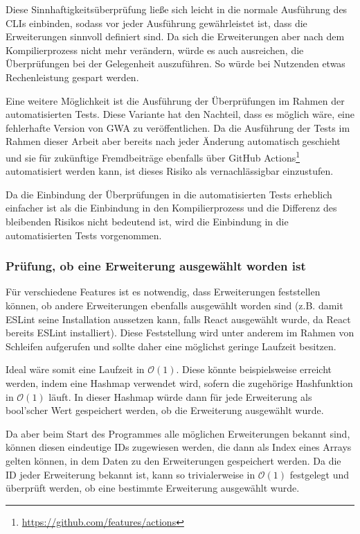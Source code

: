Diese Sinnhaftigkeitsüberprüfung ließe sich leicht in die normale Ausführung des \gls{CLI}s einbinden, sodass vor jeder Ausführung gewährleistet ist, dass die Erweiterungen sinnvoll definiert sind. Da sich die Erweiterungen aber nach dem Kompilierprozess nicht mehr verändern, würde es auch ausreichen, die Überprüfungen bei der Gelegenheit auszuführen. So würde bei Nutzenden etwas Rechenleistung gespart werden.

Eine weitere Möglichkeit ist die Ausführung der Überprüfungen im Rahmen der automatisierten Tests. Diese Variante hat den Nachteil, dass es möglich wäre, eine fehlerhafte Version von \gls{GWA} zu veröffentlichen. Da die Ausführung der Tests im Rahmen dieser Arbeit aber bereits nach jeder Änderung automatisch geschieht und sie für zukünftige Fremdbeiträge ebenfalls über GitHub Actions\footnote{\url{https://github.com/features/actions}} automatisiert werden kann, ist dieses Risiko als vernachlässigbar einzustufen.

Da die Einbindung der Überprüfungen in die automatisierten Tests erheblich einfacher ist als die Einbindung in den Kompilierprozess und die Differenz des bleibenden Risikos nicht bedeutend ist, wird die Einbindung in die automatisierten Tests vorgenommen.

\subsubsection{Prüfung, ob eine Erweiterung ausgewählt worden ist}
\label{impl:check_if_extension_has_been_chosen}
Für verschiedene Features ist es notwendig, dass Erweiterungen feststellen können, ob andere Erweiterungen ebenfalls ausgewählt worden sind (z.B. damit ESLint seine Installation aussetzen kann, falls React ausgewählt wurde, da React bereits ESLint installiert). Diese Feststellung wird unter anderem im Rahmen von Schleifen aufgerufen und sollte daher eine möglichst geringe Laufzeit besitzen.

Ideal wäre somit eine Laufzeit in $\mathcal{O}(1)$. Diese könnte beispielsweise erreicht werden, indem eine Hashmap verwendet wird, sofern die zugehörige Hashfunktion in $\mathcal{O}(1)$ läuft. In dieser Hashmap würde dann für jede Erweiterung als bool'scher Wert gespeichert werden, ob die Erweiterung ausgewählt wurde.

Da aber beim Start des Programmes alle möglichen Erweiterungen bekannt sind, können diesen eindeutige IDs zugewiesen werden, die dann als Index eines Arrays gelten können, in dem Daten zu den Erweiterungen gespeichert werden. Da die ID jeder Erweiterung bekannt ist, kann so trivialerweise in $\mathcal{O}(1)$ festgelegt und überprüft werden, ob eine bestimmte Erweiterung ausgewählt wurde.

